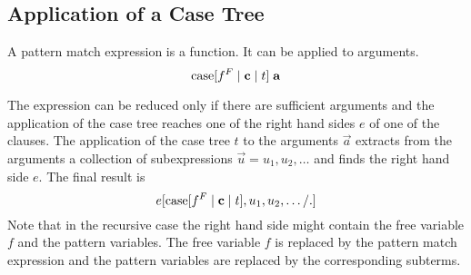 \subsection{Application of a Case Tree}

A pattern match expression is a function. It can be applied to arguments.
$$
    {\text{case}} [f^F \mid {\mathbf c} \mid t]\; {\mathbf a}
$$

The expression can be reduced only if there are sufficient arguments and the
application of the case tree reaches one of the right hand sides $e$ of one of
the clauses. The application of the case tree $t$ to the arguments $\vec a$
extracts from the arguments a collection of subexpressions $\vec u = u_1, u_2,
\ldots$ and finds the right hand side $e$. The final result is
$$
    e[{\text{case}}[f^F\mid {\mathbf c} \mid t], u_1, u_2, \ldots /.]
$$
Note that in the recursive case the right hand side might contain the free
variable $f$ and the pattern variables. The free variable $f$ is replaced by the
pattern match expression and the pattern variables are replaced by the
corresponding subterms.

